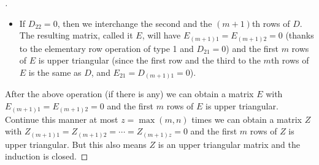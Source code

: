 \begin{proof}[]
\begin{itemize}
		\item If \(D_{2 2} = 0\), then we interchange the second and the \((m + 1)\)th rows of \(D\).
		      The resulting matrix, called it \(E\), will have \(E_{(m + 1) 1} = E_{(m + 1) 2} = 0\) (thanks to the elementary row operation of type 1 and \(D_{2 1} = 0\)) and the first \(m\) rows of \(E\) is upper triangular (since the first row and the third to the \(m\)th rows of \(E\) is the same as \(D\), and \(E_{2 1} = D_{(m + 1) 1} = 0\)).
	\end{itemize}
	After the above operation (if there is any) we can obtain a matrix \(E\) with \(E_{(m + 1) 1} = E_{(m + 1) 2} = 0\) and the first \(m\) rows of \(E\) is upper triangular.
	Continue this manner at most \(z = \max(m, n)\) times we can obtain a matrix \(Z\) with \(Z_{(m + 1) 1} = Z_{(m + 1) 2} = \cdots = Z_{(m + 1) z} = 0\) and the first \(m\) rows of \(Z\) is upper triangular.
	But this also means \(Z\) is an upper triangular matrix and the induction is closed.
\end{proof}
